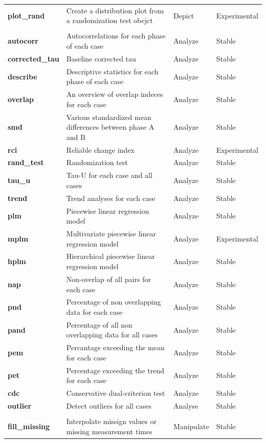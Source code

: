 \documentclass[
]{book}
\begin{document}
\begin{table}
\begin{tabular}[t]{>{\raggedright\arraybackslash}p{15em}>{\raggedright\arraybackslash}p{30em}ll}
\textbf{plot\_rand} & Create a distribution plot from a randomization test obejct & Depict & Experimental\\
\textbf{} &  &  \vphantom{2} & \\
\textbf{autocorr} & Autocorrelations for each phase of each case & Analyze & Stable\\
\textbf{corrected\_tau} & Baseline corrected tau & Analyze & Stable\\
\textbf{describe} & Descriptive statistics for each phase of each case & Analyze & Stable\\
\textbf{overlap} & An overview of overlap indeces for each case & Analyze & Stable\\
\textbf{smd} & Various standardized mean differences between phase A and B & Analyze & Stable\\
\textbf{rci} & Reliable change index & Analyze & Experimental\\
\textbf{rand\_test} & Randomization test & Analyze & Stable\\
\textbf{tau\_u} & Tau-U for each case and all cases & Analyze & Stable\\
\textbf{trend} & Trend analyses for each case & Analyze & Stable\\
\textbf{plm} & Piecewise linear regression model & Analyze & Stable\\
\textbf{mplm} & Multivariate piecewise linear regression model & Analyze & Experimental\\
\textbf{hplm} & Hierarchical piecewise linear regression model & Analyze & Stable\\
\textbf{nap} & Non-overlap of all pairs for each case & Analyze & Stable\\
\textbf{pnd} & Percentage of non overlapping data for each case & Analyze & Stable\\
\textbf{pand} & Percentage of all non overlapping data for all cases & Analyze & Stable\\
\textbf{pem} & Percantage exceeding the mean for each case & Analyze & Stable\\
\textbf{pet} & Percentage exceeding the trend for each case & Analyze & Stable\\
\textbf{cdc} & Conservative dual-criterion test & Analyze & Stable\\
\textbf{outlier} & Detect outliers for all cases & Analyse & Stable\\
\textbf{} &  &  \vphantom{1} & \\
\textbf{fill\_missing} & Interpolate missign values or missing measurement times & Manipulate & Stable\\

\end{tabular}
\end{table}
\end{document}

